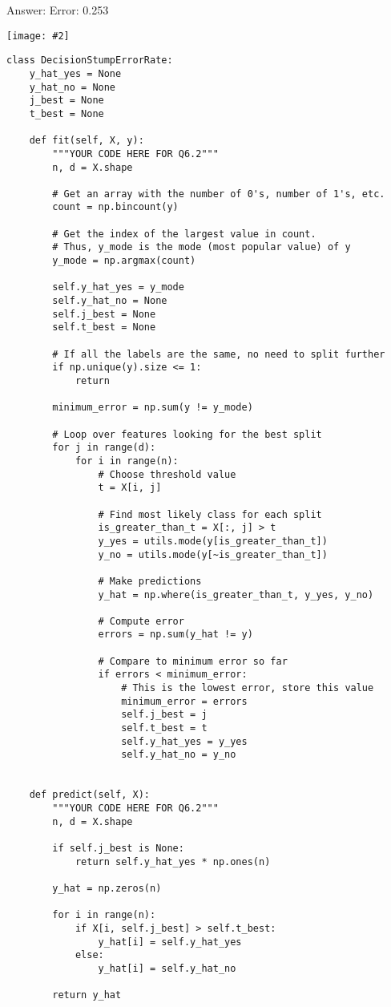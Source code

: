 \documentclass{article}
\newcommand{\gre}[1]{\textcolor{gre}{#1}}
\newcommand\ans[1]{\par\gre{Answer: #1}}
\newcommand{\centerfig}[2]{\begin{center}\texttt{[image: \#2]}\end{center}}
\begin{document}
  \ans{ 
  \newline
  Error: 0.253
  \centerfig{0.7}{./figs/DecisionStumpErrorRate_decisionBoundary}
  }
  \newpage
\begin{verbatim}
class DecisionStumpErrorRate:
    y_hat_yes = None
    y_hat_no = None
    j_best = None
    t_best = None

    def fit(self, X, y):
        """YOUR CODE HERE FOR Q6.2"""
        n, d = X.shape

        # Get an array with the number of 0's, number of 1's, etc.
        count = np.bincount(y)

        # Get the index of the largest value in count.
        # Thus, y_mode is the mode (most popular value) of y
        y_mode = np.argmax(count)

        self.y_hat_yes = y_mode
        self.y_hat_no = None
        self.j_best = None
        self.t_best = None

        # If all the labels are the same, no need to split further
        if np.unique(y).size <= 1:
            return

        minimum_error = np.sum(y != y_mode)

        # Loop over features looking for the best split
        for j in range(d):
            for i in range(n):
                # Choose threshold value
                t = X[i, j]

                # Find most likely class for each split
                is_greater_than_t = X[:, j] > t
                y_yes = utils.mode(y[is_greater_than_t])
                y_no = utils.mode(y[~is_greater_than_t])

                # Make predictions
                y_hat = np.where(is_greater_than_t, y_yes, y_no)

                # Compute error
                errors = np.sum(y_hat != y)

                # Compare to minimum error so far
                if errors < minimum_error:
                    # This is the lowest error, store this value
                    minimum_error = errors
                    self.j_best = j
                    self.t_best = t
                    self.y_hat_yes = y_yes
                    self.y_hat_no = y_no


    def predict(self, X):
        """YOUR CODE HERE FOR Q6.2"""
        n, d = X.shape

        if self.j_best is None:
            return self.y_hat_yes * np.ones(n)

        y_hat = np.zeros(n)

        for i in range(n):
            if X[i, self.j_best] > self.t_best:
                y_hat[i] = self.y_hat_yes
            else:
                y_hat[i] = self.y_hat_no

        return y_hat
\end{verbatim}
\newpage
\end{document}
